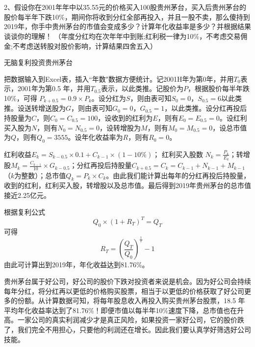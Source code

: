 
\chapter{}

2、假设你在2001年年中以35.55元的价格买入100股贵州茅台，买入后贵州茅台的股价每半年下跌10\%，期间你将收到分红全部再投入，并且一股不卖，那么傻持到2019年，你手中贵州茅台的市值会变成多少？计算年化收益率是多少？并根据结果谈谈你的理解！ （年度分红均在次年年中到账;红利税一律为10\%，不考虑交易佣金;不考虑送转股对股价影响，计算结果四舍五入）
\hspace*{\fill} \\

{\kai
\begin{table}[H]
\caption{无脑复利投资贵州茅台}
\label{tb}
\centering
\scalebox{0.6}{

}
\end{table}

把数据输入到Excel表，插入``年数"数据方便统计。记2001H年为第0年，并用$T_0$表示，2001年为第0.5 年，并用$T_{0.5}$表示，以此类推。记股价为$P$，根据股价每半年跌10\%，可得 $P_{k+0.5}=0.9\times P_{k}$。设分红为$S$，则由表可知$S_0=0$，$S_{0.5}=6$以此类推。设送转增送股为$G$，则由表可知$G_0=0$，$G_{0.5}=1$，以此类推。设分红再投后持股量为$C$，则$C_0=C_{0.5}=100$，设收到的红利为$E$，则有$E_0=E_{0.5}=0$。设红利买入股为$N$，则有$N_0=N_{0.5}=0$，设转增股为$M$，则有$M_0=M_{0.5}=0$，设总市值为$Q$，则有$Q_0=3555$。设年化收益率为$R$，则有$R_0=0$。

红利收益$E_k=S_{k-0.5}\times 0.1+C_{k-1}\times(1-10\%)$； 红利买入股数 $N_k=\frac{P_k}{E_k}$；转增股$M_k=\frac{C_{k-1}}{10}\times G_{k-0.5}$；分红再投后持股量$C_{k+0.5}=C_{k}=C_{k-1}+N_{k-1}+M_{k-1}$（$k$为整数）；总市值$Q_k=P_k\times C_k$。由此我们能计算出每年的分红再投后持股量，收到的红利，红利买入股，转增股以及总市值。最后得到2019年贵州茅台的总市值接近2.25亿元。

根据复利公式
$$Q_0\times(1+R_T)^{T}=Q_T$$
可得
$$R_T=(\frac{Q_T}{Q_0})^{\frac{1}{T}}-1$$
由此可计算出到2019年，年化收益达到81.76\%。

贵州茅台属于好公司，好公司的股价下跌对投资者来说是机会。因为好公司会持续每年分红，将分红再以更低的价格购买股票，相当于以更低的价格获取了好公司更多的份额。从计算数据可知，将每年股息收入再投入购买贵州茅台股票，18.5 年平均年化收益率达到了81.76\%！即便市值以每半年10\%速度下降，总市值也在升高。一家公司的真实利润减少才是真正风险，如果投资一家好公司，它的股价跌了，我们完全不用担心，只要他的利润还在增长。因此我们要认真学好筛选好公司技能。


}
